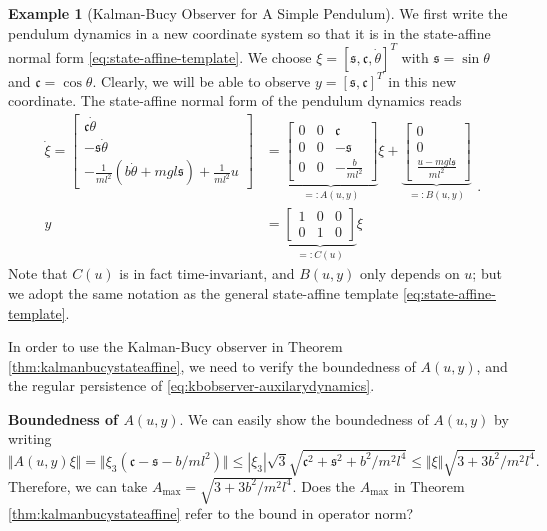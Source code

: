 \documentclass[
]{book}
\theoremstyle{definition}
\theoremstyle{definition}
\newtheorem{example}{Example}[chapter]
\theoremstyle{definition}
\theoremstyle{definition}
\theoremstyle{remark}
\begin{document}
\begin{example}[Kalman-Bucy Observer for A Simple Pendulum]
We first write the pendulum dynamics in a new coordinate system so that it is in the state-affine normal form \eqref{eq:state-affine-template}. We choose \(\xi = [\mathfrak{s},\mathfrak{c},\dot{\theta}]^T\) with \(\mathfrak{s} = \sin \theta\) and \(\mathfrak{c} = \cos \theta\). Clearly, we will be able to observe \(y = [\mathfrak{s},\mathfrak{c}]^T\) in this new coordinate. The state-affine normal form of the pendulum dynamics reads
\begin{equation}
\begin{split}
\dot{\xi} = \begin{bmatrix}
\mathfrak{c} \dot{\theta} \\
- \mathfrak{s} \dot{\theta} \\
- \frac{1}{ml^2} (b \dot{\theta} + mgl \mathfrak{s} ) +  \frac{1}{ml^2} u
\end{bmatrix} & = 
\underbrace{\begin{bmatrix}
0 & 0 & \mathfrak{c} \\
0 & 0 & -\mathfrak{s} \\
0 & 0 & -\frac{b}{ml^2}
\end{bmatrix}}_{=:A(u,y)} \xi + 
\underbrace{\begin{bmatrix}
0 \\ 0 \\ \frac{u - mgl \mathfrak{s}}{ml^2}
\end{bmatrix}}_{=:B(u,y)} \\
y & = \underbrace{\begin{bmatrix}
1 & 0 & 0 \\
0 & 1 & 0
\end{bmatrix}}_{=:C(u)} \xi
\end{split}.
\label{eq:pendulum-state-affine}
\end{equation}
Note that \(C(u)\) is in fact time-invariant, and \(B(u,y)\) only depends on \(u\); but we adopt the same notation as the general state-affine template \eqref{eq:state-affine-template}.

In order to use the Kalman-Bucy observer in Theorem \ref{thm:kalmanbucystateaffine}, we need to verify the boundedness of \(A(u,y)\), and the regular persistence of \eqref{eq:kbobserver-auxilarydynamics}.

\textbf{Boundedness of \(A(u,y)\)}. We can easily show the boundedness of \(A(u,y)\) by writing
\[
\Vert A(u,y) \xi \Vert = \Vert \xi_3 (\mathfrak{c} - \mathfrak{s} - b/ml^2) \Vert  \leq |\xi_3| \sqrt{3} \sqrt{\mathfrak{c}^2 + \mathfrak{s}^2 + b^2 / m^2 l^4} \leq \Vert \xi \Vert \sqrt{3 + 3b^2 / m^2 l^4}. 
\]
Therefore, we can take \(A_{\max} = \sqrt{3 + 3b^2 / m^2 l^4}\).
{Does the \(A_{\max}\) in Theorem \ref{thm:kalmanbucystateaffine} refer to the bound in operator norm?}


\end{example}
\end{document}
